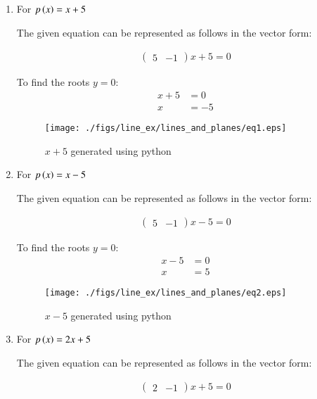 \renewcommand{\theequation}{\theenumi}
\begin{enumerate}

\item \solution For $p\left(x\right) = x + 5$ 
\begin{flushleft}
The given equation can be represented as follows in the vector form:
\end{flushleft}
\begin{align}
\begin{pmatrix}
5 & -1 
\end{pmatrix}
x + 5 = 0
\end{align}

To find the roots $y=0$:
\begin{align}
x + 5 &= 0 \\
x &= -5
\end{align}
\begin{figure}[!ht]
\centering
\texttt{[image: ./figs/line\_ex/lines\_and\_planes/eq1.eps]}
\caption{$x + 5$ generated using python}
\label{fig:eq1_lines_and_planes}
\end{figure} 
\item \solution For $p\left(x\right) = x - 5$
\begin{flushleft}
The given equation can be represented as follows in the vector form:
\end{flushleft}
\begin{align}
\begin{pmatrix}
5 & -1 
\end{pmatrix}
x - 5 = 0
\end{align}

To find the roots $y=0$:
\begin{align}
x - 5 &= 0 \\
x &= 5
\end{align}
\begin{figure}[!ht]
\centering
\texttt{[image: ./figs/line\_ex/lines\_and\_planes/eq2.eps]}
\caption{$x - 5$ generated using python}
\label{fig:eq2_lines_and_planes}
\end{figure}
\pagebreak
\item \solution For $p\left(x\right) = 2x + 5$
\begin{flushleft}
The given equation can be represented as follows in the vector form:
\end{flushleft}
\begin{align}
\begin{pmatrix}
2 & -1 
\end{pmatrix}
x + 5 = 0
\end{align}


\end{enumerate}
